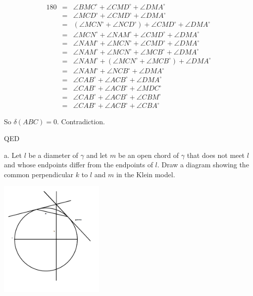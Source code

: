 \documentclass[12pt,letterpaper]{article}
\newcommand{\QED}{\begin{flushright}QED\end{flushright}}
\newcommand{\prob}[1]{\newpage\noindent {\bf #1}}
\begin{document}
\begin{eqnarray*}
180 &=& \angle BMC^\circ + \angle CMD^\circ + \angle DMA^\circ\\
&=& \angle MCD^\circ + \angle CMD^\circ + \angle DMA^\circ\\
&=& (\angle MCN^\circ + \angle NCD^\circ) + \angle CMD^\circ + \angle DMA^\circ\\
&=& \angle MCN^\circ + \angle NAM^\circ + \angle CMD^\circ + \angle DMA^\circ\\
&=& \angle NAM^\circ + \angle MCN^\circ + \angle CMD^\circ + \angle DMA^\circ\\
&=& \angle NAM^\circ + \angle MCN^\circ + \angle MCB^\circ + \angle DMA^\circ\\
&=& \angle NAM^\circ + (\angle MCN^\circ + \angle MCB^\circ) + \angle DMA^\circ\\
&=& \angle NAM^\circ + \angle NCB^\circ + \angle DMA^\circ\\
&=& \angle CAB^\circ + \angle ACB^\circ + \angle DMA^\circ\\
&=& \angle CAB^\circ + \angle ACB^\circ + \angle MDC^\circ\\
&=& \angle CAB^\circ + \angle ACB^\circ + \angle CBM^\circ\\
&=& \angle CAB^\circ + \angle ACB^\circ + \angle CBA^\circ
\end{eqnarray*}

So $\delta (ABC) = 0$.  Contradiction.


\QED







\prob{Chapter 7: K2 }

a. Let $l$ be a diameter of $\gamma$ and let $m$ be an open chord of $\gamma$ that does not meet $l$ and whose endpoints differ from the endpoints of $l$. Draw a diagram showing the common perpendicular $k$ to $l$ and $m$ in the Klein model.

\begin{center}
\includegraphics[width=2in]{klein2.png}
\end{center}
\end{document}
